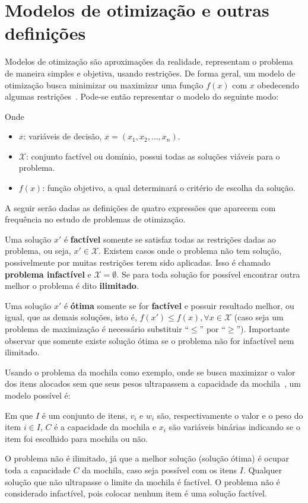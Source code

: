 \section{Modelos de otimização e outras definições}\label{sec:modelos-de-otimizacao}

Modelos de otimização são aproximações da realidade, representam o problema de maneira simples
e objetiva, usando restrições.
De forma geral, um modelo de otimização busca minimizar ou maximizar uma função $f(x)$ com $x$
obedecendo algumas restrições~\cite{calafiore2014optimization}.
Pode-se então representar o modelo do seguinte modo:



Onde

\begin{itemize}
    \item $x$: variáveis de decisão, $x = (x_1, x_2, \dots, x_n)$.
    \item $\mathcal{X}$: conjunto factível ou domínio, possui todas as soluções viáveis para o problema.
    \item $f(x)$: função objetivo, a qual determinará o critério de escolha da solução.
\end{itemize}

A seguir serão dadas as definições de quatro expressões que aparecem com frequência no estudo de
problemas de otimização.

Uma solução $x'$ é \textbf{factível} somente se satisfaz todas as restrições dadas ao problema,
ou seja, $x' \in \mathcal{X}$.
Existem casos onde o problema não tem solução, possivelmente por muitas restrições terem sido
aplicadas.
Isso é chamado \textbf{problema infactível} e $\mathcal{X} = \emptyset$.
Se para toda solução for possível encontrar outra melhor o problema é dito \textbf{ilimitado}.

Uma solução $x'$ é \textbf{ótima} somente se for \textbf{factível} e possuir resultado melhor,
ou igual, que as demais soluções, isto é, $f(x') \le f(x), \forall x \in \mathcal{X}$ (caso seja um
problema de maximização é necessário substituir “$\le$” por “$\ge$”).
Importante observar que somente existe solução ótima se o problema não for infactível nem ilimitado.

Usando o problema da mochila como exemplo, onde se busca maximizar o valor dos itens alocados
sem que seus pesos ultrapassem a capacidade da mochila~\cite{exact-solution-techniques},
um modelo possível é:



Em que $I$ é um conjunto de itens, $v_{i}$ e $w_{i}$ são, respectivamente o valor e o peso do item
$i \in I$, $C$ é a capacidade da mochila e $x_{i}$ são variáveis binárias indicando se o
item foi escolhido para mochila ou não.

O problema não é ilimitado, já que a melhor solução (solução ótima) é ocupar toda a capacidade $C$
da mochila, caso seja possível com os itens $I$.
Qualquer solução que não ultrapasse o limite da mochila é factível.
O problema não é considerado infactível, pois colocar nenhum item é uma solução factível.
